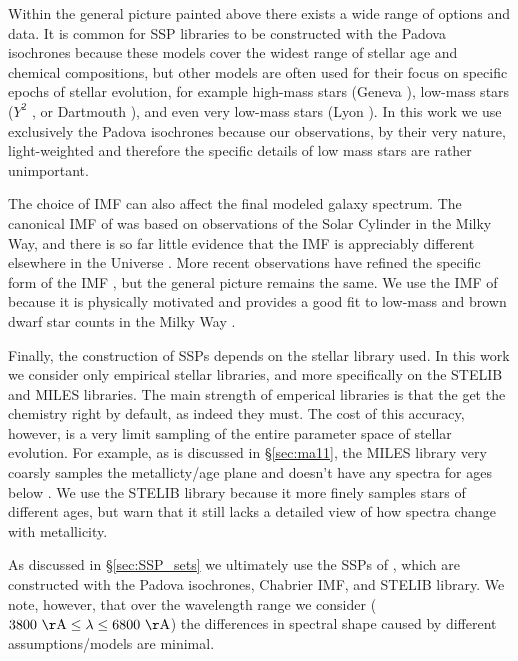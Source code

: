 Within the general picture painted above there exists a wide range of
options and data. It is common for SSP libraries to be constructed
with the Padova isochrones \citep{Bertelli94, Girardi00, Marigo08}
because these models cover the widest range of stellar age and
chemical compositions, but other models are often used for their focus
on specific epochs of stellar evolution, for example high-mass stars
(Geneva \citep{Schaller92,Meynet00}), low-mass stars ($Y^2$
\citep{Yi01,Yi03}, or Dartmouth \citep{Dotter08}), and even very
low-mass stars (Lyon \citep{Chabrier97,Baraffe98}). In this work we
use exclusively the Padova isochrones because our observations, by
their very nature, light-weighted and therefore the specific details
of low mass stars are rather unimportant.

The choice of IMF can also affect the final modeled galaxy
spectrum. The canonical IMF of \citet{Salpeter55} was based on
observations of the Solar Cylinder in the Milky Way, and there is so
far little evidence that the IMF is appreciably different elsewhere in
the Universe \citep{Bastian10}. More recent observations have refined
the specific form of the IMF \citep{Kroupa01, Chabrier03}, but the
general picture remains the same. We use the IMF of \citet{Chabrier03}
because it is physically motivated and provides a good fit to low-mass
and brown dwarf star counts in the Milky Way
\citep{Bruzual03,Chabrier01,Chabrier03}.

Finally, the construction of SSPs depends on the stellar library
used. In this work we consider only empirical stellar libraries, and
more specifically on the STELIB \citep{LeBorgne03} and MILES
\citep{Sanchez-Blazquez06} libraries. The main strength of emperical
libraries is that the get the chemistry right by default, as indeed
they must. The cost of this accuracy, however, is a very limit
sampling of the entire parameter space of stellar evolution. For
example, as is discussed in \S\ref{sec:ma11}, the MILES library very
coarsly samples the metallicty/age plane and doesn't have any spectra
for ages below . We use the STELIB library because it
more finely samples stars of different ages, but warn that it still
lacks a detailed view of how spectra change with metallicity.

As discussed in \S\ref{sec:SSP_sets} we ultimately use the SSPs of
\citet{Bruzual03}, which are constructed with the Padova isochrones,
Chabrier IMF, and STELIB library. We note, however, that over the
wavelength range we consider ($\val{3800}{\AA} \leq\lambda\leq
\val{6800}{\AA}$) the differences in spectral shape caused by
different assumptions/models are minimal.

